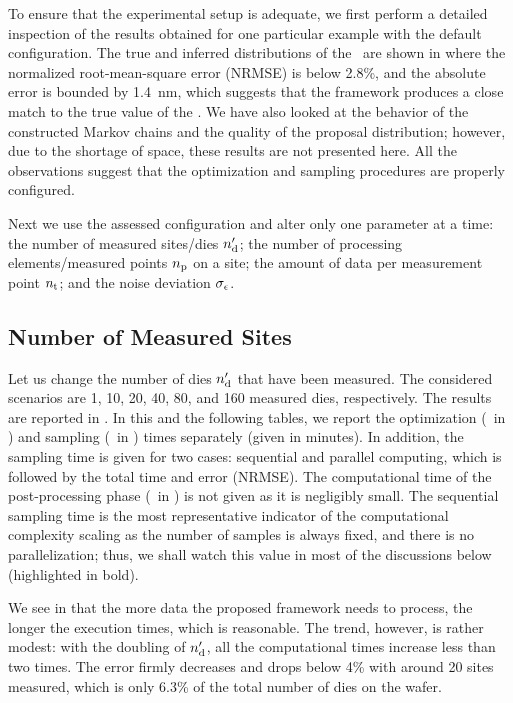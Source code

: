 To ensure that the experimental setup is adequate, we first perform a detailed inspection of the results obtained for one particular example with the default configuration.
The true and inferred distributions of the \qoi\ are shown in  where the normalized root-mean-square error (NRMSE) is below 2.8\%, and the absolute error is bounded by 1.4~nm, which suggests that the framework produces a close match to the true value of the \qoi.
We have also looked at the behavior of the constructed Markov chains and the quality of the proposal distribution; however, due to the shortage of space, these results are not presented here.
All the observations suggest that the optimization and sampling procedures are properly configured.

Next we use the assessed configuration and alter only one parameter at a time: the number of measured sites/dies ${n_\text{d}'}$; the number of processing elements/measured points ${n_\text{p}}$ on a site; the amount of data per measurement point ${n_\text{t}}$; and the noise deviation $\sigma_\epsilon$.

\subsection{Number of Measured Sites}
Let us change the number of dies ${n_\text{d}'}$ that have been measured.
The considered scenarios are 1, 10, 20, 40, 80, and 160 measured dies, respectively.
The results are reported in .
In this and the following tables, we report the optimization (\ in ) and sampling (\ in ) times separately (given in minutes).
In addition, the sampling time is given for two cases: sequential and parallel computing, which is followed by the total time and error (NRMSE).
The computational time of the post-processing phase (\ in ) is not given as it is negligibly small.
The sequential sampling time is the most representative indicator of the computational complexity scaling as the number of samples is always fixed, and there is no parallelization; thus, we shall watch this value in most of the discussions below (highlighted in bold).

We see in  that the more data the proposed framework needs to process, the longer the execution times, which is reasonable.
The trend, however, is rather modest: with the doubling of ${n_\text{d}'}$, all the computational times increase less than two times.
The error firmly decreases and drops below 4\% with around 20 sites measured, which is only 6.3\% of the total number of dies on the wafer.

